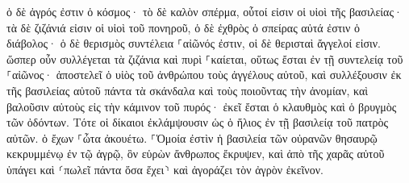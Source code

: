 \documentclass{openreader}
\begin{document}
ὁ δὲ ἀγρός ἐστιν ὁ κόσμος· τὸ δὲ καλὸν σπέρμα, οὗτοί εἰσιν οἱ υἱοὶ τῆς βασιλείας· τὰ δὲ ζιζάνιά εἰσιν οἱ υἱοὶ τοῦ πονηροῦ, 
ὁ δὲ ἐχθρὸς ὁ σπείρας αὐτά ἐστιν ὁ διάβολος· ὁ δὲ θερισμὸς συντέλεια ⸀αἰῶνός ἐστιν, οἱ δὲ θερισταὶ ἄγγελοί εἰσιν. 
ὥσπερ οὖν συλλέγεται τὰ ζιζάνια καὶ πυρὶ ⸀καίεται, οὕτως ἔσται ἐν τῇ συντελείᾳ τοῦ ⸀αἰῶνος· 
ἀποστελεῖ ὁ υἱὸς τοῦ ἀνθρώπου τοὺς ἀγγέλους αὐτοῦ, καὶ συλλέξουσιν ἐκ τῆς βασιλείας αὐτοῦ πάντα τὰ σκάνδαλα καὶ τοὺς ποιοῦντας τὴν ἀνομίαν, 
καὶ βαλοῦσιν αὐτοὺς εἰς τὴν κάμινον τοῦ πυρός· ἐκεῖ ἔσται ὁ κλαυθμὸς καὶ ὁ βρυγμὸς τῶν ὀδόντων. 
Τότε οἱ δίκαιοι ἐκλάμψουσιν ὡς ὁ ἥλιος ἐν τῇ βασιλείᾳ τοῦ πατρὸς αὐτῶν. ὁ ἔχων ⸀ὦτα ἀκουέτω. 
⸀Ὁμοία ἐστὶν ἡ βασιλεία τῶν οὐρανῶν θησαυρῷ κεκρυμμένῳ ἐν τῷ ἀγρῷ, ὃν εὑρὼν ἄνθρωπος ἔκρυψεν, καὶ ἀπὸ τῆς χαρᾶς αὐτοῦ ὑπάγει καὶ ⸂πωλεῖ πάντα ὅσα ἔχει⸃ καὶ ἀγοράζει τὸν ἀγρὸν ἐκεῖνον. 
\end{document}
